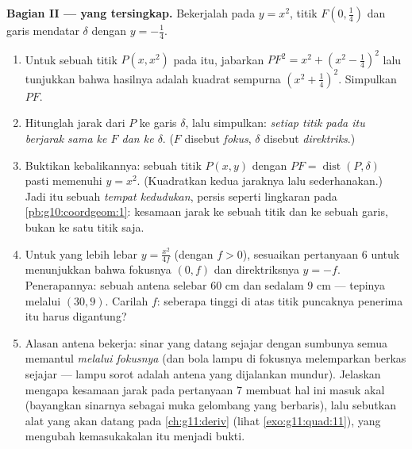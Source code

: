 \begin{problem}
\medskip
\noindent\textbf{Bagian II ---  yang tersingkap.}
Bekerjalah pada  $y = x^2$, titik
$F\left(0, \frac14\right)$ dan garis mendatar $\delta$ dengan
 $y = -\frac14$.
\begin{enumerate}[resume]
  \item Untuk sebuah titik $P(x, x^2)$ pada  itu, jabarkan
        $PF^2 = x^2 + \left(x^2 - \frac14\right)^2$ lalu tunjukkan bahwa
        hasilnya adalah kuadrat sempurna $\left(x^2 + \frac14\right)^2$.
        Simpulkan $PF$.
  \item Hitunglah jarak dari $P$ ke garis $\delta$, lalu
        simpulkan: \emph{setiap titik pada  itu berjarak
        sama ke $F$ dan ke $\delta$}. ($F$ disebut
        \emph{fokus}, $\delta$ disebut
        \emph{direktriks}.)
  \item Buktikan kebalikannya: sebuah titik $P(x, y)$ dengan
        $PF = \operatorname{dist}(P, \delta)$ pasti memenuhi
        $y = x^2$. (Kuadratkan kedua jaraknya lalu sederhanakan.)
        Jadi  itu sebuah \emph{tempat kedudukan}, persis seperti
        lingkaran pada \cref{pb:g10:coordgeom:1}: kesamaan jarak ke sebuah
        titik dan ke sebuah garis, bukan ke satu titik saja.
  \item Untuk  yang lebih lebar $y = \frac{x^2}{4f}$ (dengan
        $f > 0$), sesuaikan pertanyaan 6 untuk menunjukkan bahwa fokusnya
        $(0, f)$ dan direktriksnya $y = -f$. Penerapannya: sebuah
        antena  selebar $60$ cm dan sedalam $9$ cm --- tepinya
        melalui $(30, 9)$. Carilah $f$: seberapa tinggi di atas
        titik puncaknya penerima itu harus digantung?
  \item Alasan antena  bekerja: sinar yang datang sejajar dengan
        sumbunya semua memantul \emph{melalui fokusnya} (dan bola lampu di
        fokusnya melemparkan berkas sejajar --- lampu sorot adalah antena
         yang dijalankan mundur). Jelaskan mengapa kesamaan jarak
        pada pertanyaan 7 membuat hal ini masuk akal (bayangkan sinarnya
        sebagai muka gelombang yang berbaris), lalu sebutkan alat yang akan
        datang pada \cref{ch:g11:deriv} (lihat \cref{exo:g11:quad:11}), yang
        mengubah kemasukakalan itu menjadi bukti.
\end{enumerate}


\end{problem}
